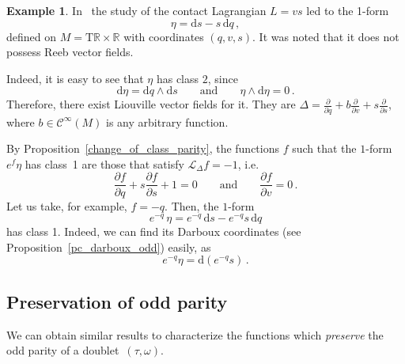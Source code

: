 \documentclass[11pt,twoside]{article}
\theoremstyle{plain}
\theoremstyle{definition}
\newtheorem{example}[theorem]{Example}
\newcommand{\R}{\mathbb{R}}
\renewcommand{\d}{\mathrm{d}}
\newcommand{\Cinfty}{\mathscr{C}^\infty}
\newcommand{\T}{{\mathrm T}}
\let\Tan\T
\newcommand{\Lie}{\mathscr{L}}
\def\d{\mathrm{d}}
\newcommand{\fracp}[2]{\frac{\partial #1}{\partial #2}}
\def\d{\mathrm{d}}
\def\Tan{\mathrm{T}}
\def\Lie{\mathscr{L}}
\begin{document}
\begin{example}
In~\cite{LGGMR_23} 
the study of the contact Lagrangian $L=vs$ led to the 1-form 
$$\eta= \d s - s \,\d q\,, $$
defined on $M = \Tan \R \times \R$ with coordinates $(q,v,s)$. 
It was noted that it does not possess Reeb vector fields.

Indeed, it is easy to see that $\eta$ has class $2$, since
    $$\d \eta = \d q \wedge \d s \qquad\text{and}\qquad \eta \wedge \d\eta = 0\,.$$
    Therefore, there exist Liouville vector fields for it. 
    They are $\Delta = \fracp{}{q}+b \fracp{}{v} + s\fracp{}{s}$, 
    where $b\in \Cinfty(M)$ is any arbitrary function.
    
    By Proposition~\ref{change_of_class_parity}, 
    the functions $f$ such that the $1$-form $e^f\eta$ has class~1 are those that satisfy 
    $\Lie_{\Delta }f = -1$, i.e.\
    $$\fracp{f}{q}+s\fracp{f}{s}+1=0 \qquad \text{and} \qquad \fracp{f}{v}=0\,.$$
    Let us take, for example, $f=-q$. Then, the $1$-form 
    $$e^{-q}\,\eta=e^{-q} \,\d s - e^{-q}s\,\d q$$
    has class 1. Indeed, we can find its Darboux coordinates (see Proposition~\ref{pc_darboux_odd}) easily, as
    $$e^{-q}\eta = \d (e^{-q}s)\,.$$
\end{example}


\subsection{Preservation of odd parity}
 
We can obtain similar results to characterize the functions which \emph{preserve} the odd parity of a doublet~$(\tau,\omega)$.
\end{document}
